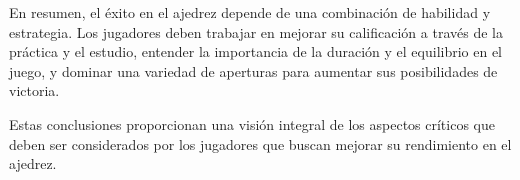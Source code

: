 \documentclass[a4paper, 12pt]{article}
\begin{document}
\vspace{5mm} %
En resumen, el éxito en el ajedrez depende de una combinación de habilidad y estrategia. Los jugadores deben trabajar en mejorar su calificación a través de la práctica y el estudio, entender la importancia de la duración y el equilibrio en el juego, y dominar una variedad de aperturas para aumentar sus posibilidades de victoria.

\vspace{5mm}%
Estas conclusiones proporcionan una visión integral de los aspectos críticos que deben ser considerados por los jugadores que buscan mejorar su rendimiento en el ajedrez.
\end{document}
